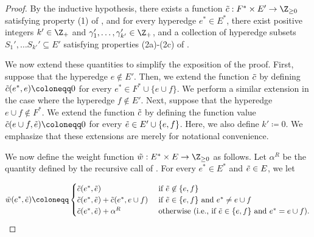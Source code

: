 \begin{proof}
    By the inductive hypothesis, there exists a function $\Tilde{c}:F^*\times E' \rightarrow \Z_{\geq 0}$ satisfying property (1) of , and for every hyperedge $e^*\in E^*$, there exist positive integers $k' \in \Z_+$ and $\gamma_1', \ldots, \gamma_{k'}' \in \Z_+$, and a collection of hyperedge subsets $S_1', \ldots S_{k'}' \subseteq E'$  satisfying properties (2a)-(2c) of .

    We now extend these  quantities to simplify the exposition of the proof. First, suppose that the hyperedge $e \not \in E'$. Then, we extend the function $\Tilde{c}$ by defining $\Tilde{c}(e^*, e) \coloneqq  0$ for every $e^* \in F^* \cup \{e\cup f\}$. We perform a similar extension in the case where the hyperedge $f \not \in E'$. Next, suppose that the hyperedge $e \cup f \not \in F^*$. We extend the function $\Tilde{c}$ by defining the function value $\Tilde{c}(e\cup f, \Tilde{e}) \coloneqq  0$ for every $\Tilde{e} \in E' \cup \{e, f\}$. Here, we also define $k' \coloneqq  0$. We emphasize that these extensions are merely for notational convenience.
   
    We now define the weight function $\Tilde{w}:E^*\times E \rightarrow \Z_{\geq 0}$ as follows. Let $\alpha^R$ be the quantity defined by the recursive call of .
    For every $e^*\in E^*$ and $\Tilde{e} \in E$, we let



$$\Tilde{w}(e^*, \Tilde{e}) \coloneqq  \begin{cases}
        \Tilde{c}(e^*, \Tilde{e})&\text{ if } \Tilde{e} \not\in \{e, f\}\\
        \Tilde{c}(e^*, \Tilde{e}) + \Tilde{c}(e^*, e \cup f)&\text{ if } \Tilde{e} \in \{e, f\} \text{ and } e^* \not = e\cup f\\
        \Tilde{c}(e^*, \Tilde{e}) + \alpha^R& \text{ otherwise (i.e., if $\Tilde{e} \in \{e, f\}$ and $e^* = e \cup f$).}
    \end{cases}$$


\end{proof}

